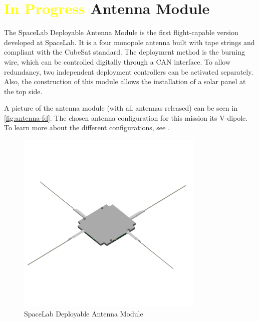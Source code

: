 \section{ \textcolor{yellow}{In Progress} Antenna Module}

The SpaceLab Deployable Antenna Module is the first flight-capable version developed at SpaceLab. It is a four monopole antenna built with tape strings and compliant with the CubeSat standard. The deployment method is the burning wire, which can be controlled digitally through a CAN interface. To allow redundancy, two independent deployment controllers can be activated separately. Also, the construction of this module allows the installation of a solar panel at the top side.

A picture of the antenna module (with all antennas released) can be seen in \autoref{fig:antenna-fd}. The chosen antenna configuration for this mission its V-dipole. To learn more about the different configurations, see \cite{ant-rad}.

\begin{figure}[!ht]
    \begin{center}
        \includegraphics[width=0.8\textwidth]{figures/subsystems/antenna-fd.png}
        \caption{SpaceLab Deployable Antenna Module}
        \label{fig:antenna-fd}
    \end{center}
\end{figure}


